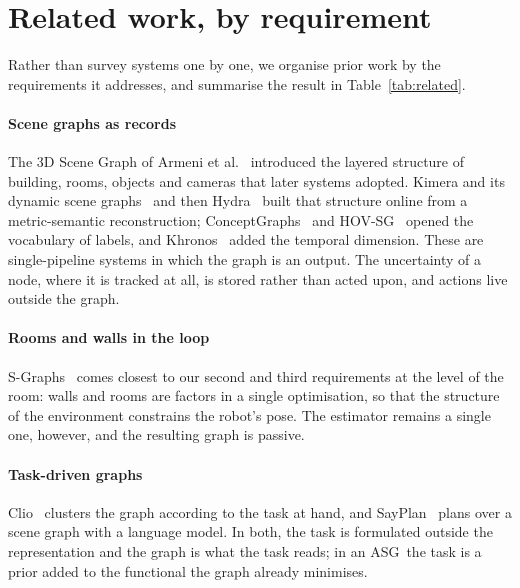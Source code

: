 \documentclass[10pt,twocolumn]{IEEEtran}
\newcommand{\asg}{ASG}
\begin{document}
\section{Related work, by requirement}\label{sec:related}

Rather than survey systems one by one, we organise prior work by the requirements it addresses, and
summarise the result in Table~\ref{tab:related}.

\paragraph{Scene graphs as records} The 3D Scene Graph of Armeni et
al.~\cite{armeni20193dscenegraphstructure} introduced the layered structure of building, rooms,
objects and cameras that later systems adopted. Kimera and its dynamic scene
graphs~\cite{rosinol20203ddynamicscenegraphs,rosinol2021kimeraslamspatialperception} and then
Hydra~\cite{hughes2022hydra,hughes2024foundations} built that structure online from a
metric-semantic reconstruction; ConceptGraphs~\cite{gu2023conceptgraphsopenvocabulary3dscene} and
HOV-SG~\cite{werby24hovsg} opened the vocabulary of labels, and
Khronos~\cite{schmid2024khronosunifiedapproachspatiotemporal} added the temporal dimension. These
are single-pipeline systems in which the graph is an output. The uncertainty of a node, where it is
tracked at all, is stored rather than acted upon, and actions live outside the graph.

\paragraph{Rooms and walls in the loop} S-Graphs~\cite{bavle2022situational,bavleSGraphs20HierarchicalSemantic2025}
comes closest to our second and third requirements at the level of the room: walls and rooms are
factors in a single optimisation, so that the structure of the environment constrains the robot's
pose. The estimator remains a single one, however, and the resulting graph is passive.

\paragraph{Task-driven graphs} Clio~\cite{maggioClioRealtimeTaskDriven2024} clusters the graph
according to the task at hand, and SayPlan~\cite{ranaSayPlanGroundingLarge2023} plans over a scene
graph with a language model. In both, the task is formulated outside the representation and the graph
is what the task reads; in an \asg\ the task is a prior added to the functional the graph already
minimises.
\end{document}
